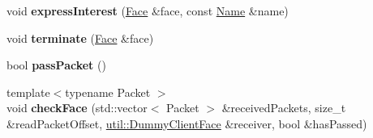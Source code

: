 \begin{DoxyCompactItemize}
\item 
void {\bfseries express\+Interest} (\hyperlink{classndn_1_1Face}{Face} \&face, const \hyperlink{classndn_1_1Name}{Name} \&name)\hypertarget{classndn_1_1tests_1_1FacesFixture_a2f23c12e833fe4d4c6afa078abcfa1a4}{}\label{classndn_1_1tests_1_1FacesFixture_a2f23c12e833fe4d4c6afa078abcfa1a4}

\item 
void {\bfseries terminate} (\hyperlink{classndn_1_1Face}{Face} \&face)\hypertarget{classndn_1_1tests_1_1FacesFixture_a997ff8d732abb8e0e3cabf4bb2f121ca}{}\label{classndn_1_1tests_1_1FacesFixture_a997ff8d732abb8e0e3cabf4bb2f121ca}

\item 
bool {\bfseries pass\+Packet} ()\hypertarget{classndn_1_1tests_1_1FacesFixture_a1f521fe1e6a6940bbc77329065d6e838}{}\label{classndn_1_1tests_1_1FacesFixture_a1f521fe1e6a6940bbc77329065d6e838}

\item 
{\footnotesize template$<$typename Packet $>$ }\\void {\bfseries check\+Face} (std\+::vector$<$ Packet $>$ \&received\+Packets, size\+\_\+t \&read\+Packet\+Offset, \hyperlink{classndn_1_1util_1_1DummyClientFace}{util\+::\+Dummy\+Client\+Face} \&receiver, bool \&has\+Passed)\hypertarget{classndn_1_1tests_1_1FacesFixture_a29956776ad8638a21950acba1ba375a7}{}\label{classndn_1_1tests_1_1FacesFixture_a29956776ad8638a21950acba1ba375a7}

\end{DoxyCompactItemize}
